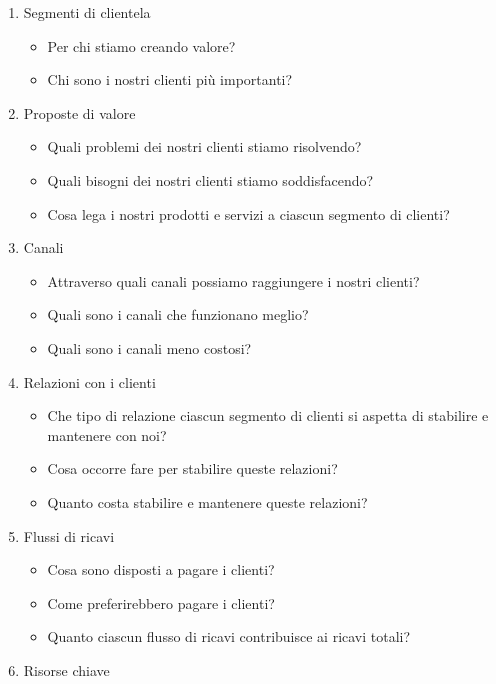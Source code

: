 \begin{enumerate}
    \item Segmenti di clientela
    \begin{itemize}
        \item Per chi stiamo creando valore?
        \item Chi sono i nostri clienti più importanti?
    \end{itemize}
    \item Proposte di valore
    \begin{itemize}
        \item Quali problemi dei nostri clienti stiamo risolvendo?
        \item Quali bisogni dei nostri clienti stiamo soddisfacendo?
        \item Cosa lega i nostri prodotti e servizi a ciascun segmento di
        clienti?
    \end{itemize}
    \item Canali
    \begin{itemize}
        \item Attraverso quali canali possiamo raggiungere i nostri clienti? 
        \item Quali sono i canali che funzionano meglio? 
        \item Quali sono i canali meno costosi?
    \end{itemize}
    \item Relazioni con i clienti
    \begin{itemize}
        \item Che tipo di relazione ciascun segmento di clienti si aspetta di
        stabilire e mantenere con noi?
        \item Cosa occorre fare per stabilire queste relazioni?
        \item Quanto costa stabilire e mantenere queste relazioni?
    \end{itemize}
    \item Flussi di ricavi
    \begin{itemize}
        \item Cosa sono disposti a pagare i clienti? 
        \item Come preferirebbero pagare i clienti? 
        \item Quanto ciascun flusso di ricavi contribuisce ai ricavi totali?
    \end{itemize}
    \item Risorse chiave
    \begin{itemize}

\end{itemize}
\end{enumerate}
